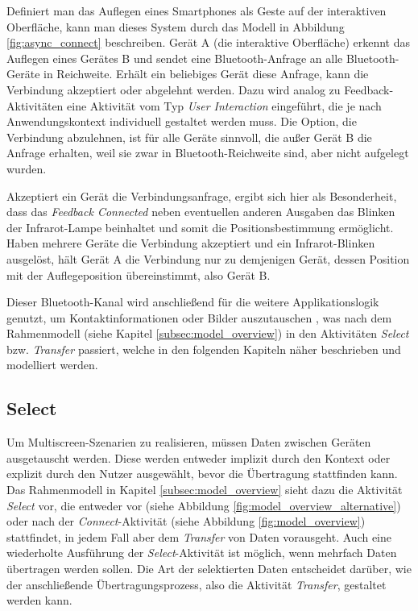 Definiert man das Auflegen eines Smartphones als Geste auf der interaktiven Oberfläche, kann man dieses System durch das Modell in Abbildung \ref{fig:async_connect} beschreiben. Gerät A (die interaktive Oberfläche) erkennt das Auflegen eines Gerätes B und sendet eine Bluetooth-Anfrage an alle Bluetooth-Geräte in Reichweite. Erhält ein beliebiges Gerät diese Anfrage, kann die Verbindung akzeptiert oder abgelehnt werden. Dazu wird analog zu Feedback-Aktivitäten eine Aktivität vom Typ \textit{User Interaction} eingeführt, die je nach Anwendungskontext individuell gestaltet werden muss. Die Option, die Verbindung abzulehnen, ist für alle Geräte sinnvoll, die außer Gerät B die Anfrage erhalten, weil sie zwar in Bluetooth-Reichweite sind, aber nicht aufgelegt wurden.

Akzeptiert ein Gerät die Verbindungsanfrage, ergibt sich hier als Besonderheit, dass das \textit{Feedback Connected} neben eventuellen anderen Ausgaben das Blinken der Infrarot-Lampe beinhaltet und somit die Positionsbestimmung ermöglicht. Haben mehrere Geräte die Verbindung akzeptiert und ein Infrarot-Blinken ausgelöst, hält Gerät A die Verbindung nur zu demjenigen Gerät, dessen Position mit der Auflegeposition übereinstimmt, also Gerät B.

Dieser Bluetooth-Kanal wird anschließend für die weitere Applikationslogik genutzt, um \zb Kontaktinformationen oder Bilder auszutauschen \citep{Wilson2007}, was nach dem Rahmenmodell (siehe Kapitel \ref{subsec:model_overview}) in den Aktivitäten \textit{Select} bzw. \textit{Transfer} passiert, welche in den folgenden Kapiteln näher beschrieben und modelliert werden.

\subsection{Select}
\label{sec:select}
Um Multiscreen-Szenarien zu realisieren, müssen Daten zwischen Geräten ausgetauscht werden. Diese werden entweder implizit durch den Kontext oder explizit durch den Nutzer ausgewählt, bevor die Übertragung stattfinden kann. Das Rahmenmodell in Kapitel \ref{subsec:model_overview} sieht dazu die Aktivität \textit{Select} vor, die entweder vor (siehe Abbildung \ref{fig:model_overview_alternative}) oder nach der \textit{Connect}-Aktivität (siehe Abbildung \ref{fig:model_overview}) stattfindet, in jedem Fall aber dem \textit{Transfer} von Daten vorausgeht. Auch eine wiederholte Ausführung der \textit{Select}-Aktivität ist möglich, wenn mehrfach Daten übertragen werden sollen. Die Art der selektierten Daten entscheidet darüber, wie der anschließende Übertragungsprozess, also die Aktivität \textit{Transfer}, gestaltet werden kann.

